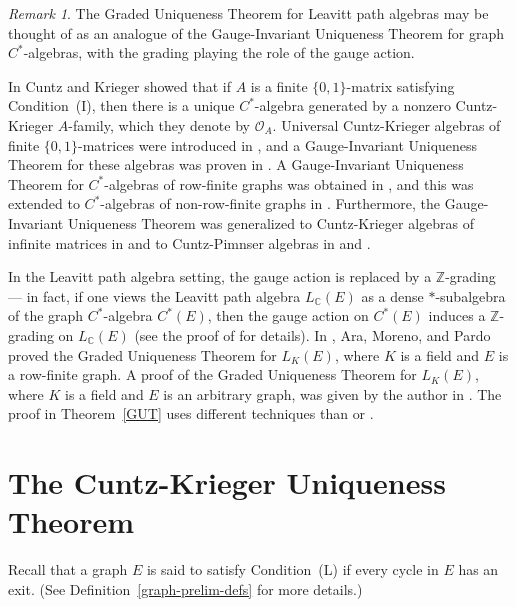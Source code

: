 \documentclass[11pt]{amsart}
\theoremstyle{remark}
\newtheorem{remark}[theorem]{Remark}
\numberwithin{equation}{section}
\newcommand{\C}{\mathbb{C}}
\begin{document}
\begin{remark} \label{GUT-better-rem}
The Graded Uniqueness Theorem for Leavitt path algebras may be thought of as an analogue of the Gauge-Invariant Uniqueness Theorem for graph $C^*$-algebras, with the grading playing the role of the gauge action.      

In \cite{CK} Cuntz and Krieger showed that if $A$ is a finite $\{0,1\}$-matrix satisfying Condition~(I), then there is a unique $C^*$-algebra generated by a nonzero Cuntz-Krieger $A$-family, which they denote by $\mathcal{O}_A$.  Universal Cuntz-Krieger algebras of finite $\{0,1\}$-matrices were introduced in \cite{aHR}, and a Gauge-Invariant Uniqueness Theorem for these algebras was proven in \cite[Theorem~2.3]{aHR}.  A Gauge-Invariant Uniqueness Theorem for $C^*$-algebras of row-finite graphs was obtained in \cite[Theorem~2.1]{BPRS}, and this was extended to $C^*$-algebras of non-row-finite graphs in \cite[Theorem~2.1]{BHRS}.  Furthermore, the Gauge-Invariant Uniqueness Theorem was generalized to Cuntz-Krieger algebras of infinite matrices in \cite[Theorem~2.7]{RS} and to Cuntz-Pimnser algebras in \cite[Theorem~4.1]{FMR} and \cite[Theorem~6.4]{Kat4}.

In the Leavitt path algebra setting, the gauge action is replaced by a $\mathbb{Z}$-grading --- in fact, if one views the Leavitt path algebra $L_\C(E)$ as a dense $*$-subalgebra of the graph $C^*$-algebra $C^*(E)$, then the gauge action on $C^*(E)$ induces a $\mathbb{Z}$-grading on $L_\C(E)$ (see the proof of \cite[Theorem~7.3]{Tom10} for details).  In \cite[Theorem~5.1]{AMP}, Ara, Moreno, and Pardo proved the Graded Uniqueness Theorem for $L_K(E)$, where $K$ is a field and $E$ is a row-finite graph.  A proof of the Graded Uniqueness Theorem for $L_K(E)$, where $K$ is a field and $E$ is an arbitrary graph, was given by the author in \cite[Theorem~4.8]{Tom10}.  The proof in Theorem~\ref{GUT} uses different techniques than \cite{AMP} or \cite{Tom10}.
\end{remark}


\section{The Cuntz-Krieger Uniqueness Theorem} \label{CKUT}

Recall that a graph $E$ is said to satisfy Condition~(L) if every cycle in $E$ has an exit.  (See Definition~\ref{graph-prelim-defs} for more details.)
\end{document}
